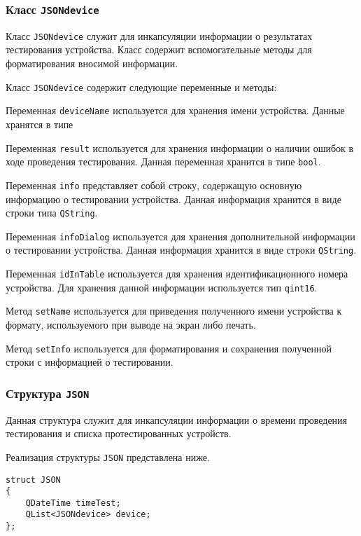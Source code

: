 \subsubsection{Класс \texttt{JSONdevice}}
Класс \texttt{JSONdevice} служит для инкапсуляции информации о результатах тестирования устройства. Класс содержит
вспомогательные методы для форматирования вносимой информации.

Класс \texttt{JSONdevice} содержит следующие переменные и методы:
\begin{enum}
	\item Переменная \texttt{deviceName} используется для хранения имени устройства. Данные хранятся в типе
	\item Переменная \texttt{result} используется для хранения информации о наличии ошибок в ходе проведения тестирования.
		Данная переменная хранится в типе \texttt{bool}.
	\item Переменная \texttt{info} представляет собой строку, содержащую основную информацию о тестировании устройства.
		Данная информация хранится в виде строки типа \texttt{QString}.
	\item Переменная \texttt{infoDialog} используется для хранения дополнительной информации о тестировании устройства.
		Данная информация хранится в виде строки \texttt{QString}.
	\item Переменная \texttt{idInTable} используется для хранения идентификационного номера устройства. Для хранения данной
		информации используется тип \texttt{qint16}.
	\item Метод \texttt{setName} используется для приведения полученного имени устройства к формату, используемого
		при выводе на экран либо печать.
	\item Метод \texttt{setInfo} используется для форматирования и сохранения полученной строки с информацией о
		тестировании.
\end{enum}

\subsubsection{Структура \texttt{JSON}}
Данная структура служит для инкапсуляции информации о времени проведения тестирования и списка протестированных
устройств.

Реализация структуры \texttt{JSON} представлена ниже.
\medskip
\begin{verbatim}
struct JSON
{
	QDateTime timeTest;
	QList<JSONdevice> device;
};
\end{verbatim}
\medskip

